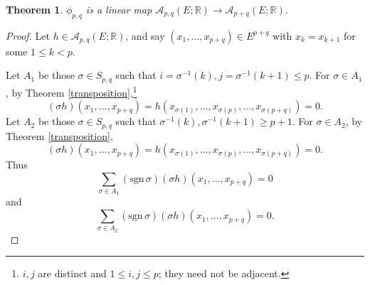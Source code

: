 \documentclass{amsart}
\newcommand{\sgn}{\mathrm{sgn}\,}
\newtheorem{theorem}{Theorem}
\theoremstyle{definition}
\begin{document}
\begin{theorem}
$\phi_{p,q}$ is a linear map $\mathscr{A}_{p,q}(E;\mathbb{R}) \to \mathscr{A}_{p+q}(E;\mathbb{R})$.
\end{theorem}
\begin{proof}
Let $h \in \mathscr{A}_{p,q}(E;\mathbb{R})$,
and say $(x_1,\ldots,x_{p+q}) \in E^{p+q}$ with $x_k=x_{k+1}$ for some $1 \leq k < p$.

Let $A_1$ be those $\sigma \in S_{p,q}$ such that  $i=\sigma^{-1}(k), j=\sigma^{-1}(k+1) \leq p$. For $\sigma \in A_1$,
by Theorem \ref{transposition},\footnote{$i,j$ are distinct and $1 \leq i,j \leq p$; they need not be adjacent.}
\[
(\sigma h)(x_1,\ldots,x_{p+q})=h(x_{\sigma(1)},\ldots,x_{\sigma(p)},\ldots,x_{\sigma(p+q)})=0.
\]
Let $A_2$ be those $\sigma \in S_{p,q}$ such that $\sigma^{-1}(k), \sigma^{-1}(k+1) \geq p+1$. For $\sigma \in A_2$,
by Theorem \ref{transposition},
\[
(\sigma h)(x_1,\ldots,x_{p+q}) = h(x_{\sigma(1)},\ldots,x_{\sigma(p)},\ldots,x_{\sigma(p+q)})=0.
\]
Thus
\[
\sum_{\sigma \in A_1} (\sgn \sigma) (\sigma h)(x_1,\ldots,x_{p+q})=0
\]
and
\[
\sum_{\sigma \in A_2} (\sgn \sigma) (\sigma h)(x_1,\ldots,x_{p+q})=0.
\]


\end{proof}
\end{document}
